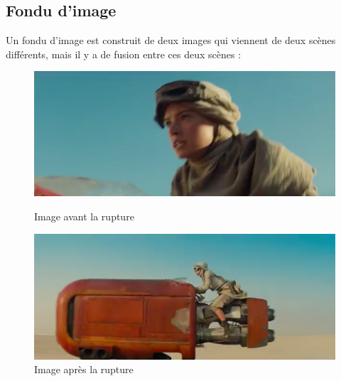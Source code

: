 \subsection{Fondu d'image}
Un fondu d’image est construit de deux images qui viennent de deux scènes différents, mais il y a de fusion entre ces deux scènes :

\begin{figure}[h!]
   \begin{minipage}[c]{.46\linewidth}
	  \centering
      \includegraphics[scale=0.3]{img/rupture2-1.png}
      \caption{\label{Avant} Image avant la rupture}
   \end{minipage} \hfill
   \begin{minipage}[c]{.46\linewidth}
      \centering
      \includegraphics[scale=0.3]{img/rupture2-2.png}
      \caption{\label{Après} Image après la rupture}
   \end{minipage}
\end{figure}